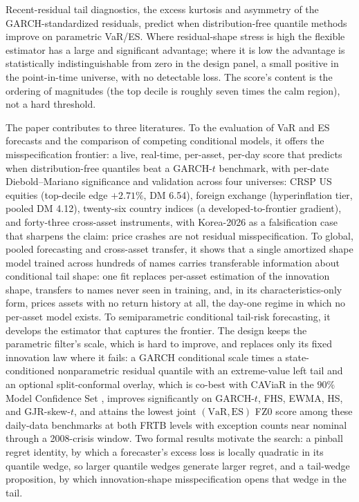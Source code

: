 \documentclass[11pt]{article}
\newcommand{\VaR}{\mathrm{VaR}}
\newcommand{\ES}{\mathrm{ES}}
\theoremstyle{remark}
\begin{document}
Recent-residual tail diagnostics, the excess kurtosis and asymmetry of
the GARCH-standardized residuals, predict when distribution-free
quantile methods improve on parametric VaR/ES. Where
residual-shape stress is high the flexible estimator has a large and
significant advantage; where it is low the advantage is
statistically indistinguishable from zero in the design panel, a small
positive in the point-in-time universe, with no detectable loss. The
score's content is the ordering of magnitudes (the top decile is
roughly seven times the calm region), not a hard threshold.

\medskip\noindent The paper contributes to three literatures. To the
evaluation of VaR and ES forecasts and the comparison of competing
conditional models, it offers the misspecification frontier: a live,
real-time, per-asset, per-day score that predicts when distribution-free
quantiles beat a GARCH-$t$ benchmark, with per-date Diebold--Mariano
significance and validation across four universes: CRSP US equities
(top-decile edge $+2.71\%$, DM 6.54), foreign exchange (hyperinflation
tier, pooled DM 4.12), twenty-six country indices (a
developed-to-frontier gradient), and forty-three cross-asset
instruments, with Korea-2026 as a falsification case that sharpens the
claim: price crashes are not residual misspecification. To global,
pooled forecasting and cross-asset transfer, it shows that a single
amortized shape model trained across hundreds of names carries
transferable information about conditional tail shape: one fit replaces
per-asset estimation of the innovation shape, transfers to names never
seen in training, and, in its characteristics-only form, prices assets
with no return history at all, the day-one regime in which no
per-asset model exists. To semiparametric conditional tail-risk
forecasting, it develops the estimator that captures the frontier. The design keeps the
parametric filter's scale, which is hard to improve, and replaces only its
fixed innovation law where it fails: a GARCH conditional scale times a
state-conditioned nonparametric residual quantile with an extreme-value left
tail and an optional split-conformal overlay, which is co-best with CAViaR
\citep{engle2004caviar} in the $90\%$ Model Confidence Set
\citep{hansen2011mcs}, improves significantly on GARCH-$t$, FHS, EWMA,
HS, and GJR-skew-$t$, and attains the lowest joint $(\VaR,\ES)$ FZ0
score among these daily-data benchmarks at both FRTB levels with exception counts near nominal through a
2008-crisis window. Two formal results motivate the search: a pinball
regret identity, by which a forecaster's excess loss is locally quadratic in
its quantile wedge, so larger quantile wedges generate larger regret,
and a tail-wedge proposition, by which innovation-shape misspecification
opens that wedge in the tail.
\end{document}
